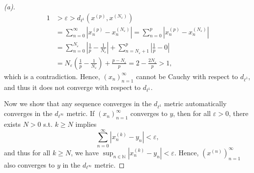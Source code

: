 \begin{proof}[(a)]
  \begin{align*}
    1 &> \varepsilon > d_{\ell ^1} \left( x^{(p)}, x^{(N_{\varepsilon } )} \right) \\
    &= \sum_{n=0}^{\infty} \left\vert x_n^{(p)} - x_n^{(N_{\varepsilon } )} \right\vert = \sum_{n=0}^{p} \left\vert x_n^{(p)} - x_n^{(N_{\varepsilon })} \right\vert \\
    &= \sum_{n=0}^{N_{\varepsilon } } \left\vert \frac{1}{p} - \frac{1}{N_{\varepsilon }} \right\vert + \sum_{n=N_{\varepsilon } + 1}^{p} \left\vert \frac{1}{p} - 0 \right\vert \\
    &= N_{\varepsilon } \left( \frac{1}{p} - \frac{1}{N_{\varepsilon }} \right) + \frac{p - N_{\varepsilon } }{p} = 2 - \frac{2N_{\varepsilon } }{p} > 1,  
  \end{align*}  
  which is a contradiction. Hence, \(\left( x_n \right)_{n=1}^{\infty}  \) cannot be Cauchy with respect to \(d_{\ell ^1}\), and thus it does not converge with respect to \(d_{\ell ^1}\). 
  
  Now we show that any sequence converges in the \(d_{\ell ^1}\) metric automatically converges in the \(d_{\ell ^{\infty} }\) metric. If \(\left( x_n \right)_{n=1}^{\infty}  \) converges to \(y\), then for all \(\varepsilon > 0\), there exists \(N > 0\) s.t. \(k \ge N\) implies 
  \[
    \sum_{n=0}^{\infty} \left\vert x_n^{(k)} - y_n \right\vert < \varepsilon ,  
  \] and thus for all \(k \ge N\), we have \(\sup _{n \in \mathbb{N} } \left\vert x_n^{(k)} - y_n \right\vert < \varepsilon \). Hence, \(\left( x^{(n)} \right)_{n=1}^{\infty}  \) also converges to \(y\) in the \(d_{\ell ^{\infty} }\) metric.  
\end{proof}
